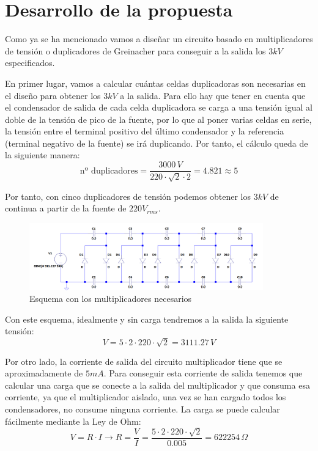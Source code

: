 \section{Desarrollo de la propuesta}

Como ya se ha mencionado vamos a diseñar un circuito basado en multiplicadores 
de tensión o duplicadores de Greinacher para conseguir a la salida los $3kV$ 
especificados. 

En primer lugar, vamos a calcular cuántas celdas duplicadoras son necesarias 
en el diseño para obtener los $3kV$ a la salida. Para ello hay que tener en cuenta que el condensador 
de salida de
cada celda duplicadora se carga a una tensión igual al doble de la tensión de pico de la fuente, por lo que 
al poner varias celdas en serie, la tensión entre el terminal positivo del último condensador 
y la referencia (terminal negativo de la fuente) se irá duplicando. Por tanto, el cálculo 
queda de la siguiente manera:
\begin{equation}
    \text{nº duplicadores} = \frac{3000\,V}{220\cdot\sqrt{2}\cdot2} = 4.821 \approx 5
\end{equation}

Por tanto, con cinco duplicadores de tensión podemos obtener los $3kV$ de continua a partir 
de la fuente de $220 V_{rms}$. 
\begin{figure}[H]
    \centering
    \includegraphics[width=0.9\textwidth]{img/mult_final.png}
    \caption{Esquema con los multiplicadores necesarios}
    \label{fig:esquema_mult}
\end{figure}

Con este esquema, idealmente y sin carga tendremos a la salida la siguiente tensión:
\begin{equation}
    V = 5\cdot2\cdot220\cdot\sqrt{2} = 3111.27\,V
\end{equation}

Por otro lado, la corriente de salida del circuito multiplicador tiene que se 
aproximadamente de $5 mA$. Para conseguir esta corriente de salida tenemos que calcular 
una carga que se conecte a la salida del multiplicador y que consuma esa corriente, ya que el multiplicador 
aislado, una vez se han cargado todos los condensadores, no consume ninguna corriente. La carga 
se puede calcular fácilmente mediante la Ley de Ohm:
\begin{equation}
    V = R\cdot I \rightarrow R = \frac{V}{I} = \frac{5\cdot2\cdot220\cdot\sqrt{2}}{0.005} = 622254\,\Omega
\end{equation}

